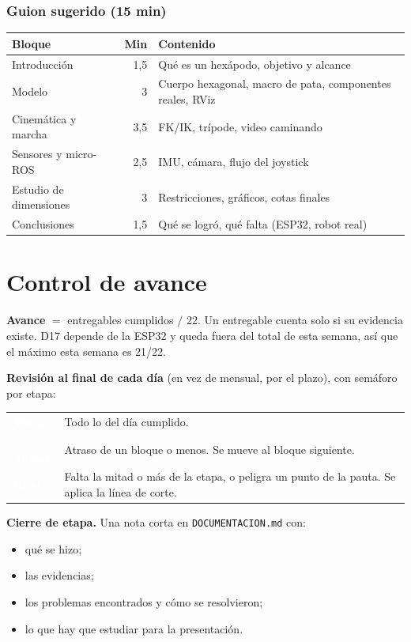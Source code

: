 \documentclass[11pt,a4paper]{article}
\newcommand{\pill}[2]{{\setlength{\fboxsep}{1.6pt}\colorbox{#1}{\textcolor{white}{\footnotesize\bfseries\,#2\,}}}}
\begin{document}
\subsubsection{Guion sugerido (15 min)}
\begin{tabularx}{\linewidth}{@{}l r Y@{}}
\toprule \textbf{Bloque} & \textbf{Min} & \textbf{Contenido}\\ \midrule
Introducción & 1,5 & Qué es un hexápodo, objetivo y alcance\\
Modelo & 3 & Cuerpo hexagonal, macro de pata, componentes reales, RViz\\
Cinemática y marcha & 3,5 & FK/IK, trípode, video caminando\\
Sensores y micro-ROS & 2,5 & IMU, cámara, flujo del joystick\\
Estudio de dimensiones & 3 & Restricciones, gráficos, cotas finales\\
Conclusiones & 1,5 & Qué se logró, qué falta (ESP32, robot real)\\
\bottomrule
\end{tabularx}

\section{Control de avance}

\textbf{Avance} $=$ entregables cumplidos $/$ 22. Un entregable cuenta solo si su evidencia existe. D17 depende de la ESP32 y queda fuera del total de esta semana, así que el máximo esta semana es 21/22.

\textbf{Revisión al final de cada día} (en vez de mensual, por el plazo), con semáforo por etapa:

\begin{tabularx}{\linewidth}{@{}l Y@{}}
\toprule
\pill{sVerde}{Verde} & Todo lo del día cumplido.\\
\pill{sAmbar}{Ámbar} & Atraso de un bloque o menos. Se mueve al bloque siguiente.\\
\pill{sRojo}{Rojo} & Falta la mitad o más de la etapa, o peligra un punto de la pauta. Se aplica la línea de corte.\\
\bottomrule
\end{tabularx}

\textbf{Cierre de etapa.} Una nota corta en \texttt{DOCUMENTACION.md} con:
\begin{itemize}
  \item qué se hizo;
  \item las evidencias;
  \item los problemas encontrados y cómo se resolvieron;
  \item lo que hay que estudiar para la presentación.
\end{itemize}
\end{document}
